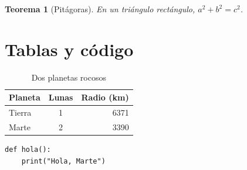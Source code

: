 \documentclass{article}
\newtheorem{teorema}{Teorema}
\begin{document}
\begin{teorema}[Pitágoras]
En un triángulo rectángulo, $a^2 + b^2 = c^2$.
\end{teorema}

\section{Tablas y código}

\begin{table}[h]
  \centering
  \begin{tabular}{|l|c|r|}
    \hline
    \textbf{Planeta} & \textbf{Lunas} & \textbf{Radio (km)} \\
    \hline
    Tierra & 1 & 6371 \\
    \hline
    Marte & 2 & 3390 \\
    \hline
  \end{tabular}
  \caption{Dos planetas rocosos}
  \label{tab:planetas}
\end{table}

\begin{verbatim}
def hola():
    print("Hola, Marte")
\end{verbatim}
\end{document}
